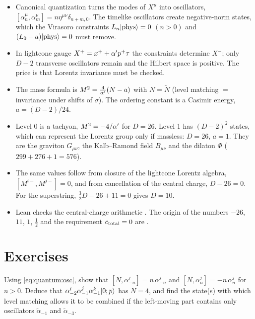 \begin{summarybox}
\begin{itemize}[leftmargin=*]
\item Canonical quantization turns the modes of $X^\mu$ into oscillators,
$[\alpha^\mu_n,\alpha^\nu_m]=n\eta^{\mu\nu}\delta_{n+m,0}$. The timelike oscillators create
negative-norm states, which the Virasoro constraints $L_n|\rm phys\rangle=0$ $(n>0)$ and
$(L_0-a)|\rm phys\rangle=0$ must remove.
\item In lightcone gauge $X^+=x^++\alpha' p^+\tau$ the constraints determine $X^-$; only $D-2$
transverse oscillators remain and the Hilbert space is positive. The price is that Lorentz
invariance must be checked.
\item The mass formula is $M^2=\frac4{\alpha'}(N-a)$ with $N=\tilde N$ (level matching $=$ invariance
under shifts of $\sigma$). The ordering constant is a Casimir energy, $a=(D-2)/24$.
\item Level 0 is a tachyon, $M^2=-4/\alpha'$ for $D=26$. Level 1 has $(D-2)^2$ states, which can
represent the Lorentz group only if massless: $D=26$, $a=1$. They are the graviton
$G_{\mu\nu}$, the Kalb--Ramond field $B_{\mu\nu}$ and the dilaton $\Phi$ ($299+276+1=576$).
\item The same values follow from closure of the lightcone Lorentz algebra,
$[M^{i-},M^{j-}]=0$, and from cancellation of the central charge, $D-26=0$. For the
superstring, $\frac32D-26+11=0$ gives $D=10$.
\item Lean checks the central-charge arithmetic \TA. The origin of the numbers $-26$, $11$,
$1$, $\frac12$ and the requirement $c_{\rm total}=0$ are \TL.
\end{itemize}
\end{summarybox}

\section*{Exercises}

\begin{exercise}[$\star$]
Using \cref{eq:quantum:osc}, show that $[N,\alpha^j_{-n}]=n\,\alpha^j_{-n}$ and
$[N,\alpha^j_n]=-n\,\alpha^j_n$ for $n>0$. Deduce that
$\alpha^{i}_{-2}\alpha^{j}_{-1}\alpha^{k}_{-1}|0;p\rangle$ has $N=4$, and find the
state(s) with which level matching allows it to be combined if the left-moving part contains
only oscillators $\tilde\alpha_{-1}$ and $\tilde\alpha_{-3}$.
\end{exercise}

